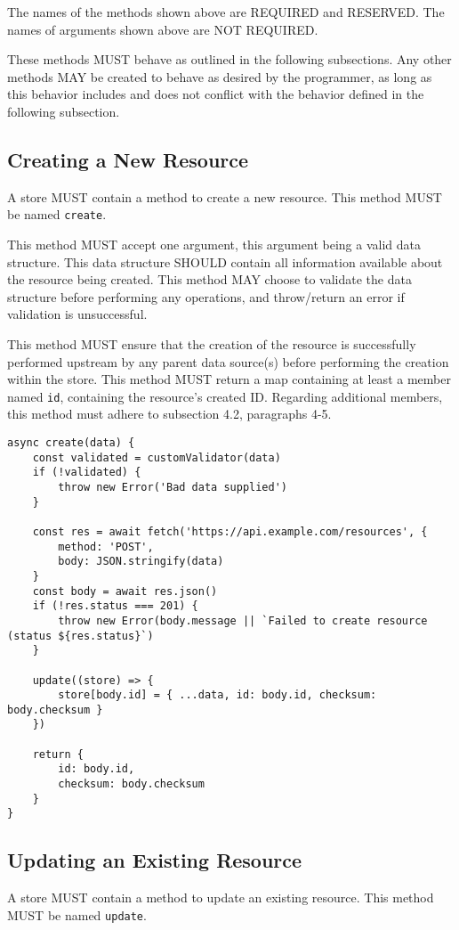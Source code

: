 \documentclass{article}
\begin{document}
The names of the methods shown above are REQUIRED and RESERVED. The names of arguments shown above are NOT REQUIRED.

These methods MUST behave as outlined in the following subsections. Any other methods MAY be created to behave as desired by the programmer, as long as this behavior includes and does not conflict with the behavior defined in the following subsection.

\subsection{Creating a New Resource}
A store MUST contain a method to create a new resource. This method MUST be named \verb|create|.

This method MUST accept one argument, this argument being a valid data structure. This data structure SHOULD contain all information available about the resource being created. This method MAY choose to validate the data structure before performing any operations, and throw/return an error if validation is unsuccessful.

This method MUST ensure that the creation of the resource is successfully performed upstream by any parent data source(s) before performing the creation within the store. This method MUST return a map containing at least a member named \verb|id|, containing the resource's created ID. Regarding additional members, this method must adhere to subsection 4.2, paragraphs 4-5.

\begin{lstlisting}[caption=Create Method]
async create(data) {
    const validated = customValidator(data)
    if (!validated) {
        throw new Error('Bad data supplied')
    }
    
    const res = await fetch('https://api.example.com/resources', {
        method: 'POST',
        body: JSON.stringify(data)
    }
    const body = await res.json()
    if (!res.status === 201) {
        throw new Error(body.message || `Failed to create resource (status ${res.status}`)
    }
    
    update((store) => {
        store[body.id] = { ...data, id: body.id, checksum: body.checksum }
    })
    
    return {
        id: body.id,
        checksum: body.checksum
    }
}
\end{lstlisting}

\subsection{Updating an Existing Resource}
A store MUST contain a method to update an existing resource. This method MUST be named \verb|update|.
\end{document}

